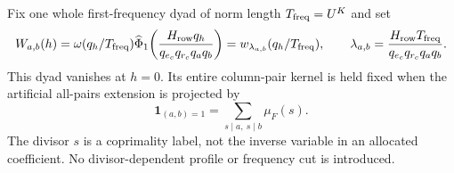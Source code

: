 \documentclass[11pt]{article}
\theoremstyle{definition}
\newcommand{\Id}{\mathbf 1}
\begin{document}
Fix one whole first-frequency dyad of norm length $T_{\rm freq}=U^K$ and set
\begin{equation}\label{sj-dyadic-weight}
 W_{a,b}(h)=\omega(q_h/T_{\rm freq})\widehat\Phi_1\!\left(
 \frac{H_{\rm row}q_h}{q_{e_c}q_{r_c}q_aq_b}\right)
 =w_{\lambda_{a,b}}(q_h/T_{\rm freq}),\qquad
 \lambda_{a,b}=\frac{H_{\rm row}T_{\rm freq}}{q_{e_c}q_{r_c}q_aq_b}.
\end{equation}
This dyad vanishes at $h=0$.  Its entire column-pair kernel is held fixed
when the artificial all-pairs extension is projected by
\begin{equation}\label{sj-projector}
 \Id_{(a,b)=1}=\sum_{s\mid a,\ s\mid b}\mu_F(s).
\end{equation}
The divisor $s$ is a coprimality label, not the inverse variable in an
allocated coefficient.  No divisor-dependent profile or frequency cut is
introduced.
\end{document}
